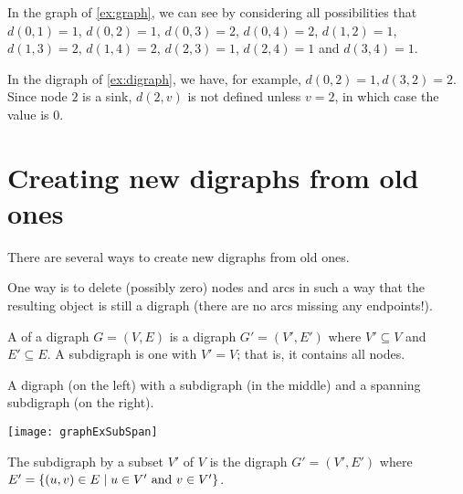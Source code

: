\begin{Example}
In the graph of \cref{ex:graph}, we can see by considering
all possibilities that $d(0, 1) = 1$, $d(0, 2) = 1$, $d(0, 3) = 2$,
$d(0, 4) = 2$, $d(1, 2) = 1$, $d(1, 3) = 2$, $d(1, 4) = 2$, $d(2, 3) =
1$, $d(2, 4) = 1$ and $d(3, 4) = 1$.

In the digraph of \cref{ex:digraph}, we have, for example, $d(0, 2) = 1, d(3, 2) = 2$. 
Since node $2$ is a sink, $d(2, v)$ is not defined unless $v = 2$, in which case the value is $0$.
\end{Example}



\section{Creating new digraphs from old ones}

There are several ways to create new digraphs from old ones.

One way is to delete (possibly zero) nodes and arcs in such a way that the 
resulting object is still a digraph (there are no arcs missing any
endpoints!).

\begin{Definition}
A  of a digraph $G = (V, E)$ is a digraph $G' = (V', E')$ 
where $V'\subseteq V$ and $E'\subseteq E$. 
A  subdigraph is one with $V' = V$; that is, it contains all nodes.
\end{Definition}

\begin{Example}
A digraph (on the left) with a subdigraph (in the middle) and a spanning subdigraph (on the right).
\begin{center}
\texttt{[image: graphExSubSpan]} 
\end{center}
\end{Example}

\begin{Definition}
The subdigraph  by a subset $V'$ of $V$ is the digraph
$G' = (V', E')$ where $E' = \mbox{$\{(u, v) \in E \mid u \in V' \mbox{ and } v\in V'\}$}$.
\end{Definition}

